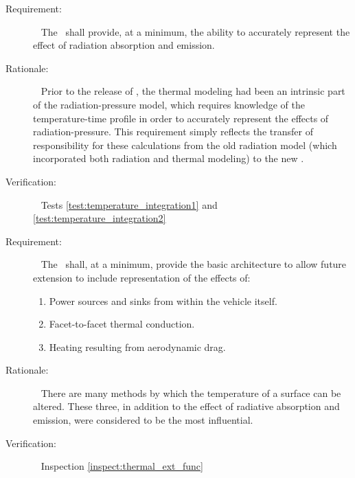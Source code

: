\label{reqt:thermal_min_func}
\begin{description}
  \item[Requirement:]\ \newline
    The \ThermalRiderDesc\ shall provide, at a minimum, the ability to accurately represent the effect of radiation absorption and emission.
\item[Rationale:]\ \newline
  Prior to the release of
  \JEODid, the thermal modeling had been an intrinsic part of the radiation-pressure model, which requires knowledge of the temperature-time profile in order to accurately represent the effects of radiation-pressure.  This requirement simply reflects the transfer of responsibility for these calculations from the old radiation model (which incorporated both radiation and thermal modeling) to the new \ThermalRiderDesc.
  \item[Verification:]\ \newline
	  Tests \vref{test:temperature_integration1} and \vref{test:temperature_integration2}
\end{description}

\label{reqt:thermal_ext_func}
\begin{description}
  \item[Requirement:]\ \newline
    The \ThermalRiderDesc\ shall, at a minimum, provide the basic architecture to allow future extension to include representation of the effects of:
  \begin{enumerate}
    \item Power sources and sinks from within the vehicle itself.
    \item Facet-to-facet thermal conduction.
    \item Heating resulting from aerodynamic drag.
  \end{enumerate}
\item[Rationale:]\ \newline
  There are many methods by which the temperature of a surface can be altered.  These three, in addition to the effect of radiative absorption and emission, were considered to be the most influential.
  \item[Verification:]\ \newline
	  Inspection \vref{inspect:thermal_ext_func}
\end{description}

